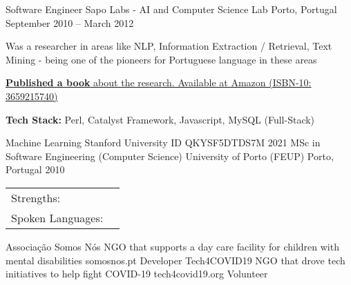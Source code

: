 \documentclass[]{awesome-cv}
\begin{document}
\begin{cventries}
	\vspace{-4mm}
	\cventry
	{Software Engineer}
	{Sapo Labs - AI and Computer Science Lab}
	{Porto, Portugal}
	{September 2010 – March 2012}
	{\begin{cvitems}
		\item {Was a researcher in areas like NLP, Information Extraction / Retrieval, Text Mining - being one of the pioneers for Portuguese language in these areas}
		\item {\href{https://www.amazon.com/Automatic-Extraction-of-Biographical-Data/dp/3659215740}{\textbf{Published a book} about the research. Available at Amazon (ISBN-10: 3659215740)}}
		\item {\textbf{Tech Stack:} Perl, Catalyst Framework, Javascript, MySQL (Full-Stack)}
		\end{cvitems}}
\end{cventries}
\vspace{-5mm}

\vspace{-3mm}
\begin{cvhonors}
	\cvhonor
	{Machine Learning}
	{Stanford University}
	{ID QKYSF5DTDS7M}
	{2021}
	\cvhonor
	{MSc in Software Engineering (Computer Science)}
	{University of Porto (FEUP)}
	{Porto, Portugal}
	{2010}
\end{cvhonors}

\vspace{-3mm}
\begin{cventries}
	\vspace{-2mm}
	\cventry
	{}
	{\def\arraystretch{1.15}{\begin{tabular}{ l l }
		Strengths:  & {\skill{ Leadership, Coaching, Self-Motivation, Problem Solver, Outside-the-box Thinking, Builder, Empowering \& Motivating others }} \\
		Spoken Languages:  & {\skill{ English, Portuguese, French, Spanish, Slovene}} \\
		\end{tabular}}}
	{}
	{}
	{}
\end{cventries}

\vspace{-11mm}

\vspace{-3mm}

\begin{cvhonors}
	\cvhonor
	{Associação Somos Nós}
	{NGO that supports a day care facility for children with mental disabilities}
	{somosnos.pt}
	{Developer}
	\cvhonor
	{Tech4COVID19}
	{NGO that drove tech initiatives to help fight COVID-19}
	{tech4covid19.org}
	{Volunteer}
\end{cvhonors}
\
\end{document}
